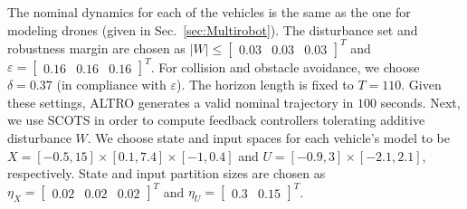 The nominal dynamics for each of the vehicles is the same as the one  for modeling drones (given in Sec.~\ref{sec:Multirobot}). The disturbance set and robustness margin are chosen as $|W|\leq \begin{bmatrix}0.03&0.03&0.03\end{bmatrix}^T$ and $\varepsilon=\begin{bmatrix}0.16&0.16&0.16\end{bmatrix}^T$. %
For collision and obstacle avoidance, we choose $\delta=0.37$ (in compliance with
$\varepsilon$). %
The horizon length is fixed to $T=110$. 
Given these settings, ALTRO generates a valid nominal trajectory in $100$ seconds. 
Next, we use SCOTS in order to compute feedback controllers tolerating additive disturbance $W$. %
We choose state and input spaces for each vehicle's model to be $X=[-0.5,15]\times[0.1,7.4]\times[-1,0.4]$ and $U=[-0.9,3]\times[-2.1,2.1]$, respectively. State and input partition sizes are chosen as $\eta_{X}=\begin{bmatrix}0.02&0.02&0.02\end{bmatrix}^T$ and $\eta_{U}=\begin{bmatrix}0.3&0.15\end{bmatrix}^T$. %
